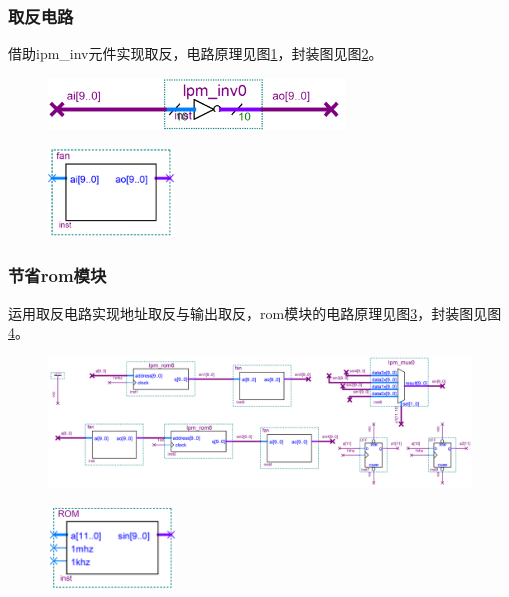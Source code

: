 \documentclass[12pt]{article}
\begin{document}
\subsubsection{取反电路}
借助ipm\_inv元件实现取反，电路原理见图\ref{fig:qufan}，封装图见图\ref{fig:fengzhuangqufan}。
\begin{figure}[hp]
	\centering  
	\includegraphics[width=0.7\textwidth]{picture/qufan.png} 
	\caption{}
	\label{fig:qufan}   
\end{figure}
\begin{figure}[hp]
	\centering  
	\includegraphics[width=0.3\textwidth]{picture/qufanfz.png} 
	\caption{}
	\label{fig:fengzhuangqufan}   
\end{figure}
\subsubsection{节省rom模块}
运用取反电路实现地址取反与输出取反，rom模块的电路原理见图\ref{fig:jies}，封装图见图\ref{fig:fengzhuangjies}。
\begin{figure}[hp]
	\centering  
	\includegraphics[width=\textwidth]{picture/jies.png} 
	\caption{}
	\label{fig:jies}   
\end{figure}
\begin{figure}[hp]
	\centering  
	\includegraphics[width=0.3\textwidth]{picture/jiesfz.png} 
	\caption{}
	\label{fig:fengzhuangjies}   
\end{figure}
\end{document}
